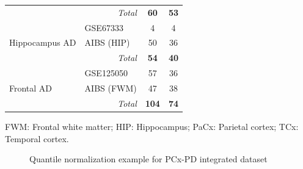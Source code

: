 \begin{table}[ht]
\begin{tabular}{llcc}
                                      & \multicolumn{1}{r}{\textit{Total}} & \textbf{60}  & \textbf{53}  \\
\multirow{3}{*}{Hippocampus AD}       & GSE67333                           & 4            & 4            \\
                                      & AIBS (HIP)                         & 50           & 36           \\ \cline{3-4} 
                                      & \multicolumn{1}{r}{\textit{Total}} & \textbf{54}  & \textbf{40}  \\
\multirow{3}{*}{Frontal AD}           & GSE125050                          & 57           & 36           \\
                                      & AIBS (FWM)                         & 47           & 38           \\ \cline{3-4} 
                                      & \multicolumn{1}{r}{\textit{Total}} & \textbf{104} & \textbf{74}  \\ \hline
\end{tabular}

\footnotesize FWM: Frontal white matter; HIP: Hippocampus; PaCx: Parietal cortex; TCx: Temporal cortex.
\end{table}

\begin{figure}%
    \centering
    \qquad
    \caption{Quantile normalization example for PCx-PD integrated dataset}%
    \label{fig:norm}%
\end{figure}

